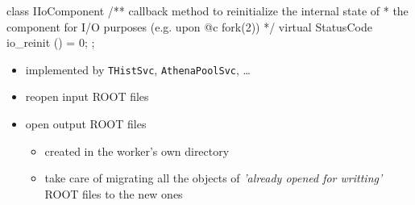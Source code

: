 \documentclass[9pt]{beamer}
\begin{document}
\begin{frame}[fragile]{}

  \begin{columns}
    \begin{column}{0.95\textwidth}

\begin{C++}
class IIoComponent
{
  /** callback method to reinitialize the internal state of
   *  the component for I/O purposes (e.g. upon @c fork(2))
   */
  virtual
  StatusCode io_reinit () = 0;
};
\end{C++}

\begin{block}{}
\begin{itemize}
  \item implemented by \texttt{THistSvc}, \texttt{AthenaPoolSvc}, \ldots
  \item reopen input ROOT files
  \item open output ROOT files
    \begin{itemize}
      \item created in the worker's own directory
      \item take care of migrating all the objects of \emph{'already opened for writting'} ROOT files to the new ones
    \end{itemize}
\end{itemize}
\end{block}

    \end{column}
  \end{columns}
\end{frame}
\end{document}
